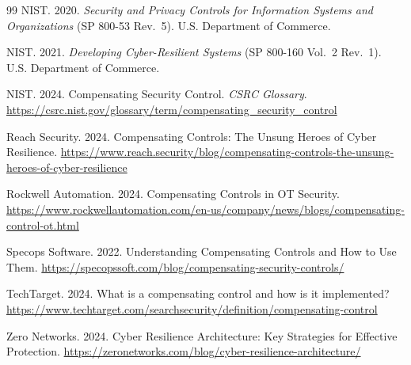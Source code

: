 \documentclass[sigconf,nonacm]{acmart}
\begin{document}
\begin{thebibliography}{99}
NIST. 2020. \textit{Security and Privacy Controls for Information Systems and
Organizations} (SP 800-53 Rev.\ 5). U.S. Department of Commerce.

NIST. 2021. \textit{Developing Cyber-Resilient Systems} (SP 800-160 Vol.\ 2 Rev.\ 1).
U.S. Department of Commerce.

NIST. 2024. Compensating Security Control. \textit{CSRC Glossary}.
\url{https://csrc.nist.gov/glossary/term/compensating_security_control}

Reach Security. 2024. Compensating Controls: The Unsung Heroes of Cyber Resilience.
\url{https://www.reach.security/blog/compensating-controls-the-unsung-heroes-of-cyber-resilience}

Rockwell Automation. 2024. Compensating Controls in OT Security.
\url{https://www.rockwellautomation.com/en-us/company/news/blogs/compensating-control-ot.html}

Specops Software. 2022. Understanding Compensating Controls and How to Use Them.
\url{https://specopssoft.com/blog/compensating-security-controls/}

TechTarget. 2024. What is a compensating control and how is it implemented?
\url{https://www.techtarget.com/searchsecurity/definition/compensating-control}

Zero Networks. 2024. Cyber Resilience Architecture: Key Strategies for Effective
Protection.
\url{https://zeronetworks.com/blog/cyber-resilience-architecture/}

\end{thebibliography}
\end{document}
